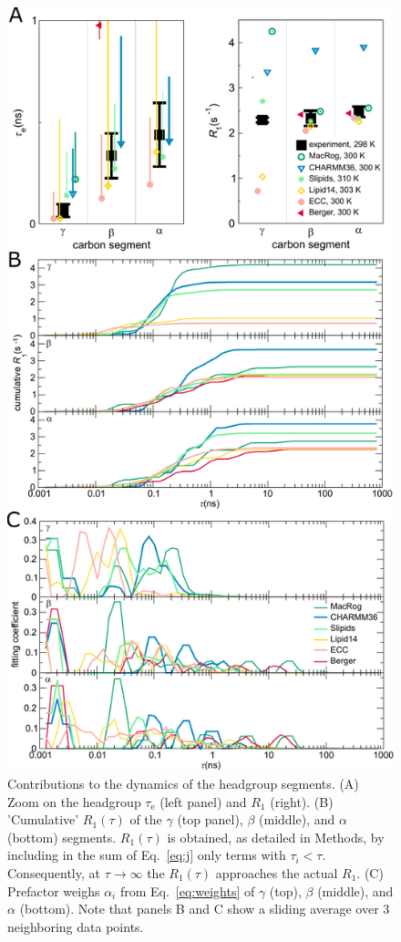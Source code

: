 \documentclass[journal=jcisd8,manuscript=article,layout=twocolumn]{achemso}
\begin{document}
\begin{figure}[!h]
\centering
\includegraphics[width=\columnwidth]{../Figs/cumulativeR1.pdf}
\caption{Contributions to the dynamics of the headgroup segments.
(A) Zoom on the headgroup $\tau_\mathrm e$ (left panel) and $R_1$ (right).
(B) 'Cumulative' $R_1(\tau)$ of the
$\gamma$ (top panel), $\beta$ (middle), and $\alpha$ (bottom) segments.
$R_1(\tau)$ is obtained, as detailed in Methods,
by including in the sum of Eq.~\eqref{eq:j} only terms with $\tau_i<\tau$.
Consequently, at $\tau\to\infty$ the $R_1(\tau)$ approaches the actual $R_1$.
(C) Prefactor weighs $\alpha_i$ from Eq.~\eqref{eq:weights} of $\gamma$ (top), $\beta$ (middle), and $\alpha$ (bottom).
Note that panels B and C show a sliding average over 3 neighboring data points.
}
\label{fig:cumulativeR1s}
\end{figure}
\end{document}
